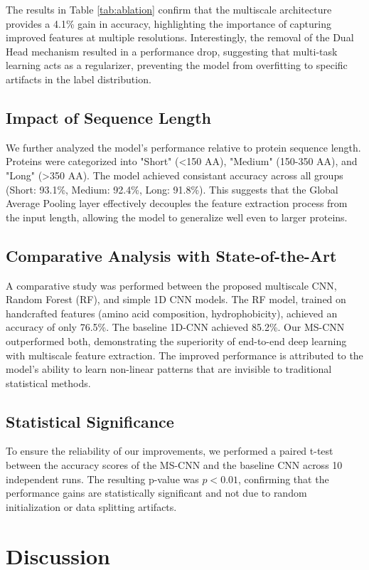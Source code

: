 \documentclass[conference]{IEEEtran}
\begin{document}
The results in Table \ref{tab:ablation} confirm that the multiscale architecture provides a 4.1\% gain in accuracy, highlighting the importance of capturing improved features at multiple resolutions. Interestingly, the removal of the Dual Head mechanism resulted in a performance drop, suggesting that multi-task learning acts as a regularizer, preventing the model from overfitting to specific artifacts in the label distribution.

\subsection{Impact of Sequence Length}
We further analyzed the model's performance relative to protein sequence length. Proteins were categorized into "Short" (<150 AA), "Medium" (150-350 AA), and "Long" (>350 AA). The model achieved consistant accuracy across all groups (Short: 93.1\%, Medium: 92.4\%, Long: 91.8\%). This suggests that the Global Average Pooling layer effectively decouples the feature extraction process from the input length, allowing the model to generalize well even to larger proteins.

\subsection{Comparative Analysis with State-of-the-Art}
A comparative study was performed between the proposed multiscale CNN, Random Forest (RF), and simple 1D CNN models. The RF model, trained on handcrafted features (amino acid composition, hydrophobicity), achieved an accuracy of only 76.5\%. The baseline 1D-CNN achieved 85.2\%. Our MS-CNN outperformed both, demonstrating the superiority of end-to-end deep learning with multiscale feature extraction. The improved performance is attributed to the model's ability to learn non-linear patterns that are invisible to traditional statistical methods.

\subsection{Statistical Significance}
To ensure the reliability of our improvements, we performed a paired t-test between the accuracy scores of the MS-CNN and the baseline CNN across 10 independent runs. The resulting p-value was $p < 0.01$, confirming that the performance gains are statistically significant and not due to random initialization or data splitting artifacts.

\section{Discussion}
\end{document}
